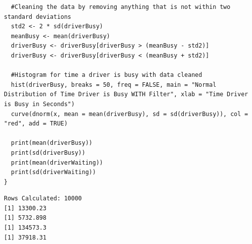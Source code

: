 \documentclass{article}
\numberwithin{equation}{section}
\begin{document}
\begin{lstlisting}
  #Cleaning the data by removing anything that is not within two standard deviations
  std2 <- 2 * sd(driverBusy)
  meanBusy <- mean(driverBusy)
  driverBusy <- driverBusy[driverBusy > (meanBusy - std2)]
  driverBusy <- driverBusy[driverBusy < (meanBusy + std2)]
  
  #Histogram for time a driver is busy with data cleaned
  hist(driverBusy, breaks = 50, freq = FALSE, main = "Normal Distribution of Time Driver is Busy WITH Filter", xlab = "Time Driver is Busy in Seconds")
  curve(dnorm(x, mean = mean(driverBusy), sd = sd(driverBusy)), col = "red", add = TRUE)
  
  print(mean(driverBusy))
  print(sd(driverBusy))
  print(mean(driverWaiting))
  print(sd(driverWaiting))
}
\end{lstlisting}
\begin{verbatim}
Rows Calculated: 10000 
[1] 13300.23
[1] 5732.898
[1] 134573.3
[1] 37918.31
\end{verbatim}
\end{document}
